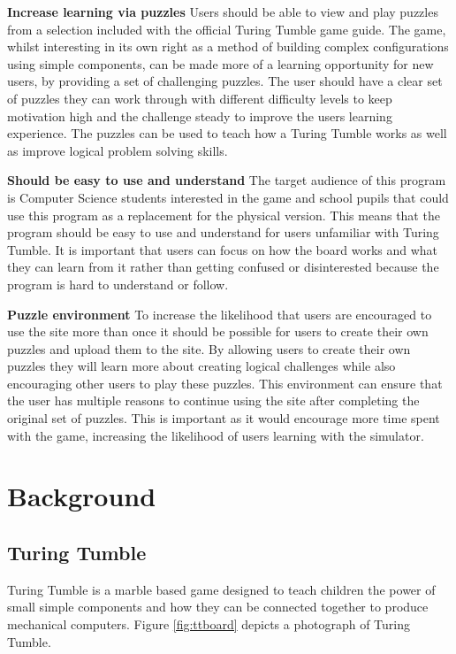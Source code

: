 \documentclass{l4proj}
\begin{document}
\textbf{Increase learning via puzzles} Users should be able to view and play puzzles from a selection included with the official Turing Tumble game guide. The game, whilst interesting in its own right as a method of building complex configurations using simple components, can be made more of a learning opportunity for new users, by providing a set of challenging puzzles. The user should have a clear set of puzzles they can work through with different difficulty levels to keep motivation high and the challenge steady to improve the users learning experience. The puzzles can be used to teach how a Turing Tumble works as well as improve logical problem solving skills.    

\textbf{Should be easy to use and understand} The target audience of this program is Computer Science students interested in the game and school pupils that could use this program as a replacement for the physical version. This means that the program should be easy to use and understand for users unfamiliar with Turing Tumble. It is important that users can focus on how the board works and what they can learn from it rather than getting confused or disinterested because the program is hard to understand or follow. 

\textbf{Puzzle environment} To increase the likelihood that users are encouraged to use the site more than once it should be possible for users to create their own puzzles and upload them to the site. By allowing users to create their own puzzles they will learn more about creating logical challenges while also encouraging other users to play these puzzles. This environment can ensure that the user has multiple reasons to continue using the site after completing the original set of puzzles. This is important as it would encourage more time spent with the game, increasing the likelihood of users learning with the simulator. 

\chapter{Background}
\section{Turing Tumble}
\label{section:background}
Turing Tumble is a marble based game designed to teach children the power of small simple components and how they can be connected together to produce mechanical computers. Figure \ref{fig:ttboard} depicts a photograph of Turing Tumble.
\end{document}
